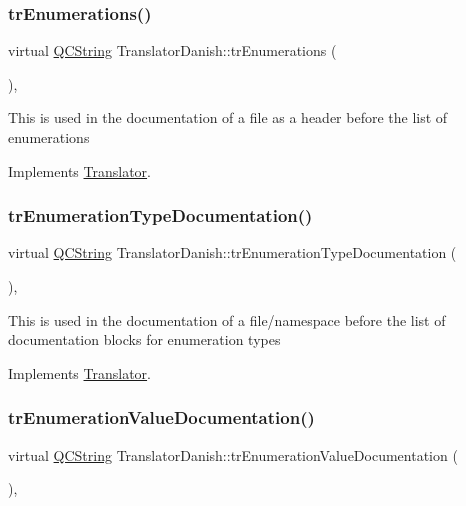 \subsubsection{\texorpdfstring{trEnumerations()}{trEnumerations()}}
{\footnotesize\ttfamily virtual \mbox{\hyperlink{class_q_c_string}{Q\+C\+String}} Translator\+Danish\+::tr\+Enumerations (\begin{DoxyParamCaption}{ }\end{DoxyParamCaption})\hspace{0.3cm}{\ttfamily [inline]}, {\ttfamily [virtual]}}

This is used in the documentation of a file as a header before the list of enumerations 

Implements \mbox{\hyperlink{class_translator}{Translator}}.

\mbox{\label{class_translator_danish_a4b64eda641679cb576ebbd9d84028c95}} 
\subsubsection{\texorpdfstring{trEnumerationTypeDocumentation()}{trEnumerationTypeDocumentation()}}
{\footnotesize\ttfamily virtual \mbox{\hyperlink{class_q_c_string}{Q\+C\+String}} Translator\+Danish\+::tr\+Enumeration\+Type\+Documentation (\begin{DoxyParamCaption}{ }\end{DoxyParamCaption})\hspace{0.3cm}{\ttfamily [inline]}, {\ttfamily [virtual]}}

This is used in the documentation of a file/namespace before the list of documentation blocks for enumeration types 

Implements \mbox{\hyperlink{class_translator}{Translator}}.

\mbox{\label{class_translator_danish_a09c94be7996ebad077f4d606a302072b}} 
\subsubsection{\texorpdfstring{trEnumerationValueDocumentation()}{trEnumerationValueDocumentation()}}
{\footnotesize\ttfamily virtual \mbox{\hyperlink{class_q_c_string}{Q\+C\+String}} Translator\+Danish\+::tr\+Enumeration\+Value\+Documentation (\begin{DoxyParamCaption}{ }\end{DoxyParamCaption})\hspace{0.3cm}{\ttfamily [inline]}, {\ttfamily [virtual]}}

